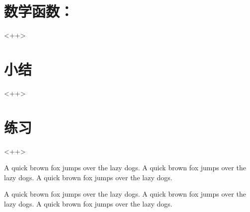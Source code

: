 \section{数学函数：}<++>

\section{小结}<++>

\section{练习}<++>

A quick brown fox jumps over the lazy dogs.
A quick brown fox jumps over the lazy dogs.
A quick brown fox jumps over the lazy dogs.

A quick brown fox jumps over the lazy dogs.
A quick brown fox jumps over the lazy dogs.
A quick brown fox jumps over the lazy dogs.

\newpage{\thispagestyle{empty}\cleardoublepage}

